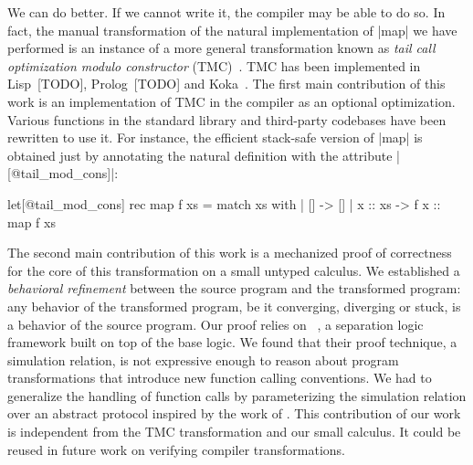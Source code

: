 We can do better.
%
If we cannot write it, the compiler may be able to do so.
%
In fact, the manual transformation of the natural implementation of \ocaml|map| we have performed is an instance of a more general transformation known as \emph{tail call optimization modulo constructor} (TMC)~\cite{risch-73,friedman-wise-75}.
%
TMC has been implemented in Lisp~[TODO], Prolog~[TODO] and Koka~\cite{DBLP:journals/pacmpl/LeijenL23}.
%
The first main contribution of this work is an implementation of TMC in the \OCamlLang compiler as an optional optimization.
%
Various functions in the standard library and third-party codebases have been rewritten to use it.
%
For instance, the efficient stack-safe version of \ocaml|map| is obtained just by annotating the natural definition with the attribute \ocaml|[@tail_mod_cons]|:

\begin{OCaml}
let[@tail_mod_cons] rec map f xs =
  match xs with
  | [] -> []
  | x :: xs -> f x :: map f xs
\end{OCaml}

The second main contribution of this work is a mechanized proof of correctness for the core of this transformation on a small untyped calculus.
%
We established a \emph{behavioral refinement} between the source program and the transformed program: any behavior of the transformed program, be it converging, diverging or stuck, is a behavior of the source program.
%
Our proof relies on \Simuliris~\cite{DBLP:journals/pacmpl/GaherSSJDKKD22}, a separation logic framework built on top of the \Iris base logic.
%
We found that their proof technique, a simulation relation, is not expressive enough to reason about program transformations that introduce new function calling conventions.
%
We had to generalize the \Simuliris handling of function calls by parameterizing the simulation relation over an abstract protocol inspired by the work of \citet*{DBLP:journals/pacmpl/VilhenaP21}.
%
This contribution of our work is independent from the TMC transformation and our small calculus.
%
It could be reused in future work on verifying compiler transformations.

